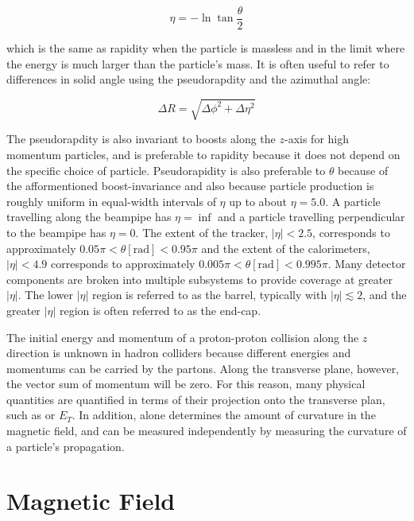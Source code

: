 \begin{equation}\label{eq:pseudorapidity}
\eta = - \ln \tan \frac{\theta}{2}
\end{equation}

\noindent which is the same as rapidity when the particle is massless and in the limit where the energy is much larger than the particle's mass.
It is often useful to refer to differences in solid angle using the pseudorapdity and the azimuthal angle:

\begin{equation}\label{eq:deltar}
\Delta R = \sqrt{\Delta \phi^2 + \Delta \eta^2}
\end{equation}


The pseudorapdity is also invariant to boosts along the $z$-axis for high momentum particles, and is preferable to rapidity because it does not depend on the specific choice of particle.
Pseudorapidity is also preferable to $\theta$ because of the afformentioned boost-invariance and also because particle production is roughly uniform in equal-width intervals of $\eta$ up to about $\eta = 5.0$. 
A particle travelling along the beampipe has $\eta = \inf$ and a particle travelling perpendicular to the beampipe has $\eta = 0$.
The extent of the tracker, $|\eta| < 2.5$, corresponds to approximately $0.05 \pi < \theta [\mathrm{rad}] < 0.95 \pi$ and the extent of the calorimeters, $|\eta| < 4.9$ corresponds to approximately $0.005 \pi < \theta [\mathrm{rad}] < 0.995 \pi$.
Many detector components are broken into multiple subsystems to provide coverage at greater $|\eta|$.
The lower $|\eta|$ region is referred to as the barrel, typically with $|\eta| \lesssim 2$, and the greater $|\eta|$ region is often referred to as the end-cap.

The initial energy and momentum of a proton-proton collision along the $z$ direction is unknown in hadron colliders because different energies and momentums can be carried by the partons.
Along the transverse plane, however, the vector sum of momentum will be zero.
For this reason, many physical quantities are quantified in terms of their projection onto the transverse plan, such as \pt or $E_T$.
In addition, \pt alone determines the amount of curvature in the magnetic field, and can be measured independently by measuring the curvature of a particle's propagation.


\section{Magnetic Field}

